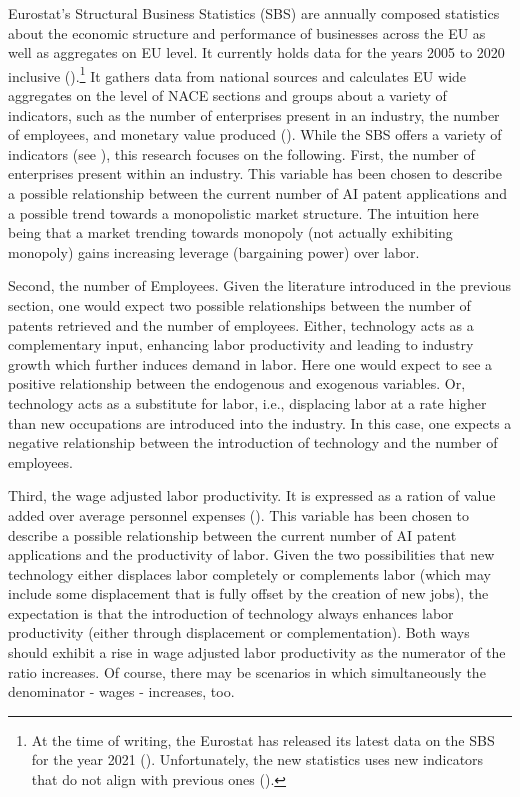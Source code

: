 \documentclass[
  12pt,
  a4paperpaper,
]{article}
\begin{document}
Eurostat's Structural Business Statistics (SBS) are annually composed
statistics about the economic structure and performance of businesses
across the EU as well as aggregates on EU level. It currently holds data
for the years 2005 to 2020 inclusive
().\footnote{At the time of writing, the
  Eurostat has released its latest data on the SBS for the year 2021
  ().
  Unfortunately, the new statistics uses new indicators that do not
  align with previous ones
  ().} It gathers data from national sources and
calculates EU wide aggregates on the level of NACE sections and groups
about a variety of indicators, such as the number of enterprises present
in an industry, the number of employees, and monetary value produced
(). While the SBS offers a variety of indicators (see
), this research focuses on the following. First, the number of
enterprises present within an industry. This variable has been chosen to
describe a possible relationship between the current number of AI patent
applications and a possible trend towards a monopolistic market
structure. The intuition here being that a market trending towards
monopoly (not actually exhibiting monopoly) gains increasing leverage
(bargaining power) over labor.

Second, the number of Employees. Given the literature introduced in the
previous section, one would expect two possible relationships between
the number of patents retrieved and the number of employees. Either,
technology acts as a complementary input, enhancing labor productivity
and leading to industry growth which further induces demand in labor.
Here one would expect to see a positive relationship between the
endogenous and exogenous variables. Or, technology acts as a substitute
for labor, i.e., displacing labor at a rate higher than new occupations
are introduced into the industry. In this case, one expects a negative
relationship between the introduction of technology and the number of
employees.

Third, the wage adjusted labor productivity. It is expressed as a ration
of value added over average personnel expenses
(). This variable has been chosen to describe
a possible relationship between the current number of AI patent
applications and the productivity of labor. Given the two possibilities
that new technology either displaces labor completely or complements
labor (which may include some displacement that is fully offset by the
creation of new jobs), the expectation is that the introduction of
technology always enhances labor productivity (either through
displacement or complementation). Both ways should exhibit a rise in
wage adjusted labor productivity as the numerator of the ratio
increases. Of course, there may be scenarios in which simultaneously the
denominator - wages - increases, too.
\end{document}
